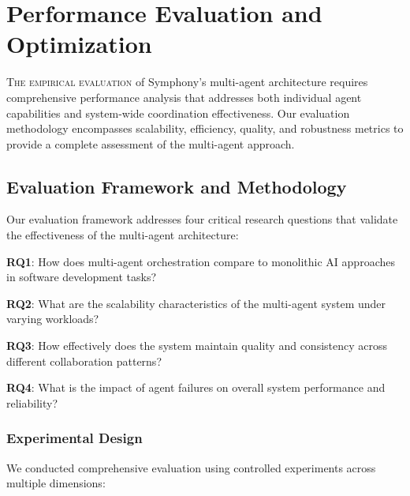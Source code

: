 
\section*{Performance Evaluation and Optimization}

\lettrine{T}{he empirical evaluation} of Symphony's multi-agent architecture requires comprehensive performance analysis that addresses both individual agent capabilities and system-wide coordination effectiveness. Our evaluation methodology encompasses scalability, efficiency, quality, and robustness metrics to provide a complete assessment of the multi-agent approach.

\subsection*{Evaluation Framework and Methodology}

Our evaluation framework addresses four critical research questions that validate the effectiveness of the multi-agent architecture:

\begin{expandedlist}
    \item \textbf{RQ1}: How does multi-agent orchestration compare to monolithic AI approaches in software development tasks?
    \item \textbf{RQ2}: What are the scalability characteristics of the multi-agent system under varying workloads?
    \item \textbf{RQ3}: How effectively does the system maintain quality and consistency across different collaboration patterns?
    \item \textbf{RQ4}: What is the impact of agent failures on overall system performance and reliability?
\end{expandedlist}

\subsubsection*{Experimental Design}

We conducted comprehensive evaluation using controlled experiments across multiple dimensions:

